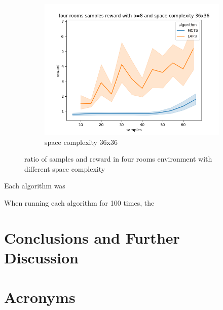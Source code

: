 \documentclass[bibliography=totoc]{scrartcl}
\begin{document}
\begin{figure}[h!]
    \begin{subfigure}[b]{0.3\linewidth}
        \includegraphics[width=\linewidth]{img/four_rooms_samples__reward_b_8_LAP3_MCTS_36.png}
        \caption{space complexity 36x36}
    \end{subfigure}
    \caption{ratio of samples and reward in four rooms environment with different space complexity}
    \label{fig:known_problems}
\end{figure}


Each algorithm was

When running each algorithm for 100 times, the


\section{Conclusions and Further Discussion}


\clearpage


\section*{Acronyms}

\begin{acronym}[....]
\end{acronym}



\end{document}
